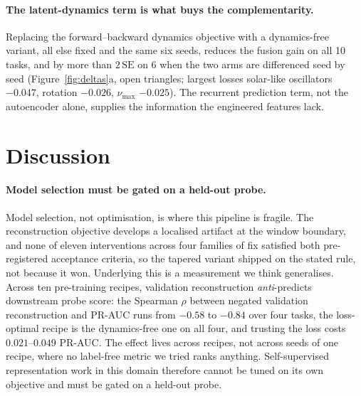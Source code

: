 \documentclass{article}
\begin{document}
\paragraph{The latent-dynamics term is what buys the complementarity.} Replacing the
forward--backward dynamics objective with a dynamics-free variant, all else fixed and the same six
seeds, reduces the fusion gain on all 10 tasks, and by more than $2\,\mathrm{SE}$ on 6 when the two
arms are differenced seed by seed (Figure~\ref{fig:deltas}a, open triangles; largest losses solar-like
oscillators $-0.047$, rotation $-0.026$, $\nu_{\max}$ $-0.025$). The recurrent prediction term, not
the autoencoder alone, supplies the information the engineered features lack.

\section{Discussion}

\paragraph{Model selection must be gated on a held-out probe.} Model selection, not optimisation, is
where this pipeline is fragile. The reconstruction objective develops a localised artifact at the
window boundary, and none of eleven interventions across four families of fix satisfied both
pre-registered acceptance criteria, so the tapered variant shipped on the stated rule, not because it
won. Underlying this is a
measurement we think generalises. Across ten pre-training
recipes, validation reconstruction \emph{anti}-predicts downstream probe score: the Spearman $\rho$
between negated validation reconstruction and PR-AUC runs from $-0.58$ to $-0.84$ over four tasks, the
loss-optimal recipe is the dynamics-free one on all four, and trusting the loss costs $0.021$--$0.049$
PR-AUC. The effect lives across recipes, not across seeds of one recipe, where no label-free metric we
tried ranks anything. Self-supervised representation work in this domain therefore cannot be tuned on
its own objective and must be gated on a held-out probe.
\end{document}
